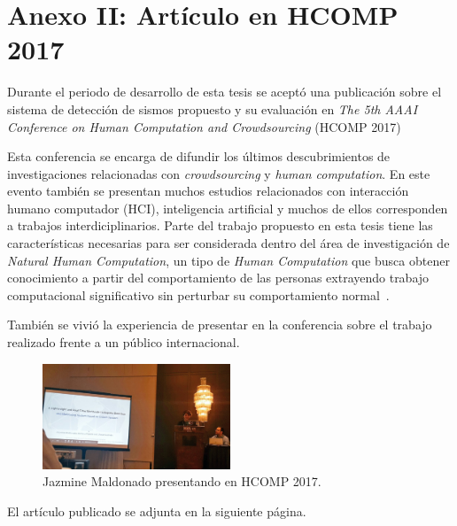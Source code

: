 \chapter*{Anexo II: Artículo en HCOMP 2017}
\label{anexo:paper}

Durante el periodo de desarrollo de esta tesis se aceptó una publicación sobre el sistema de detección de sismos propuesto y su evaluación en \textit{The 5th AAAI Conference on Human Computation and Crowdsourcing} (HCOMP 2017)

Esta conferencia se encarga de difundir los últimos descubrimientos de investigaciones relacionadas con \textit{crowdsourcing} y \textit{human computation}. En este evento también se presentan muchos estudios relacionados con interacción humano computador (HCI), inteligencia artificial y muchos de ellos corresponden a trabajos interdiciplinarios. Parte del trabajo propuesto en esta tesis tiene las características necesarias para ser considerada dentro del área de investigación de \textit{Natural Human Computation}, un tipo de \textit{Human Computation} que busca obtener conocimiento a partir del comportamiento de las personas extrayendo trabajo computacional significativo sin perturbar su comportamiento normal~\cite{EstradaAndLawhead}. 

También se vivió la experiencia de presentar en la conferencia sobre el trabajo realizado frente a un público internacional.

\begin{figure}[!h]
\centering
	\includegraphics[width=0.5\textwidth]{imagenes/hcomp.jpg}
	\caption{Jazmine Maldonado presentando en HCOMP 2017.}
\label{fig:hcomp}
\end{figure} 

El artículo publicado se adjunta en la siguiente página. 

